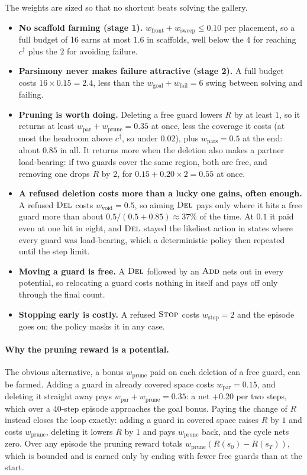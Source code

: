 \documentclass[11pt,a4paper]{article}
\begin{document}
The weights are sized so that no shortcut beats solving the gallery.
\begin{itemize}
  \item \textbf{No scaffold farming (stage 1).} $w_{\mathrm{front}} + w_{\mathrm{sweep}} \le
        0.10$ per placement, so a full budget of 16 earns at most $1.6$ in scaffolds, well
        below the $4$ for reaching $c^\dagger$ plus the $2$ for avoiding failure.
  \item \textbf{Parsimony never makes failure attractive (stage 2).} A full budget costs
        $16\times0.15 = 2.4$, less than the $w_{\mathrm{goal}}+w_{\mathrm{fail}} = 6$ swing
        between solving and failing.
  \item \textbf{Pruning is worth doing.} Deleting a free guard lowers $R$ by at least $1$, so
        it returns at least $w_{\mathrm{par}} + w_{\mathrm{prune}} = 0.35$ at once, less the
        coverage it costs (at most the headroom above $c^\dagger$, so under $0.02$), plus
        $w_{\mathrm{pars}} = 0.5$ at the end: about $0.85$ in all. It returns more when the
        deletion also makes a partner load-bearing: if two guards cover the same region, both
        are free, and removing one drops $R$ by $2$, for $0.15 + 0.20\times2 = 0.55$ at once.
  \item \textbf{A refused deletion costs more than a lucky one gains, often enough.} A refused
        $\textsc{Del}$ costs $w_{\mathrm{void}} = 0.5$, so aiming $\textsc{Del}$ pays only where it hits a free
        guard more than about $0.5/(0.5+0.85)\approx 37\%$ of the time. At $0.1$ it paid even
        at one hit in eight, and $\textsc{Del}$ stayed the likeliest action in states where every guard
        was load-bearing, which a deterministic policy then repeated until the step limit.
  \item \textbf{Moving a guard is free.} A $\textsc{Del}$ followed by an $\textsc{Add}$ nets out in every
        potential, so relocating a guard costs nothing in itself and pays off only through
        the final count.
  \item \textbf{Stopping early is costly.} A refused $\textsc{Stop}$ costs $w_{\mathrm{stop}} = 2$ and
        the episode goes on; the policy masks it in any case.
\end{itemize}

\paragraph{Why the pruning reward is a potential.}
The obvious alternative, a bonus $w_{\mathrm{prune}}$ paid on each deletion of a free guard,
can be farmed. Adding a guard in already covered space costs $w_{\mathrm{par}} =
0.15$, and deleting it straight away pays $w_{\mathrm{par}} + w_{\mathrm{prune}} = 0.35$: a net
$+0.20$ per two steps, which over a 40-step episode approaches the goal bonus. Paying the
change of $R$ instead closes the loop exactly: adding a guard in covered space raises $R$ by $1$
and costs $w_{\mathrm{prune}}$, deleting it lowers $R$ by $1$ and pays $w_{\mathrm{prune}}$
back, and the cycle nets zero. Over any episode the pruning reward totals
$w_{\mathrm{prune}}(R(s_0)-R(s_T))$, which is bounded and is earned only by ending with fewer
free guards than at the start.
\end{document}
